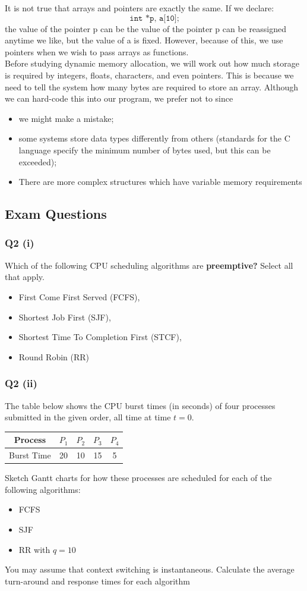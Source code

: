 \documentclass[a4paper, 10pt]{article}
\begin{document}
It is not true that arrays and pointers are exactly the same. If we declare:
$$\texttt{int *p, a[10];}$$
the value of the pointer p can be the value of the pointer p can be reassigned anytime we like, but the value of a is fixed. However, because of this, we use pointers when we wish to pass arrays as functions. \\[2ex]
Before studying dynamic memory allocation, we will work out how much
storage is required by integers, floats, characters, and even pointers. This is because we need to tell the system how many bytes are required to store an array. Although we can hard-code this into our program, we prefer not to since
\begin{itemize}
    \item we might make a mistake;
    \item some systems store data types differently from others (standards for
          the C language specify the minimum number of bytes used, but this
          can be exceeded);
    \item There are more complex structures which have variable memory
          requirements
\end{itemize}
\subsection{Exam Questions}
\subsubsection*{Q2 (i)}
Which of the following CPU scheduling algorithms are \textbf{preemptive?} Select all that apply.
\begin{itemize}
    \item First Come First Served (FCFS),
    \item Shortest Job First (SJF),
    \item Shortest Time To Completion First (STCF),
    \item Round Robin (RR)
\end{itemize}
\subsubsection*{Q2 (ii)}
The table below shows the CPU burst times (in seconds) of four processes submitted in the given order, all time at time $t = 0$.
\begin{center}
    \begin{tabular}{c|c|c|c|c}
        Process    & $P_1$ & $P_2$ & $P_3$ & $P_4$ \\
        \hline
        Burst Time & 20    & 10    & 15    & 5     \\
    \end{tabular}
\end{center}
Sketch Gantt charts for how these processes are scheduled for each of the
following algorithms:
\begin{itemize}
    \item FCFS
    \item SJF
    \item RR with $q = 10$
\end{itemize}
You may assume that context switching is instantaneous. Calculate the average turn-around and response times for each algorithm
\end{document}
